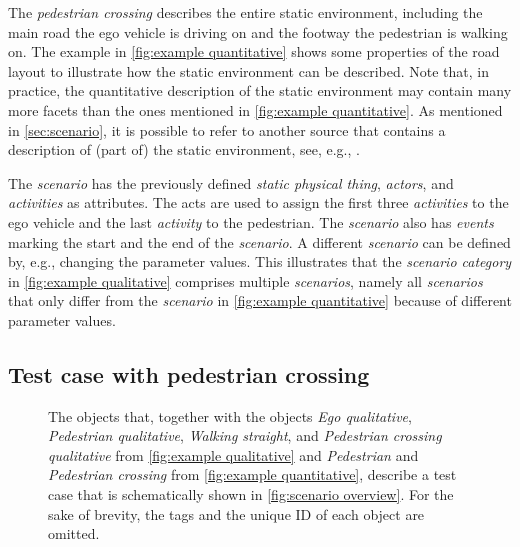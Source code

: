 The \textit{pedestrian crossing} describes \cstartd the entire static environment, including \cendd the main road the ego vehicle is driving on and the footway the pedestrian is walking on. The example in \cref{fig:example quantitative} shows some properties of the road layout to illustrate how the static environment can be described. Note that, in practice, the quantitative description of the static environment may contain many more facets than the ones mentioned in \cref{fig:example quantitative}. As mentioned in \cref{sec:scenario}, it is possible to refer to another source that contains a description of (part of) the static environment, see, e.g., \autocite{dupuis2010opendrive}. 

The \textit{scenario} has the previously defined \cstartc\textit{static physical thing}\cendc, \textit{actors}, and \textit{activities} as attributes. The acts are used to assign the first three \textit{activities} to the ego vehicle and the last \textit{activity} to the pedestrian. 
The \textit{scenario} also has \cstartb \textit{events} marking the start and the end of the \textit{scenario}\cendb.
A different \textit{scenario} can be defined by, e.g., changing the parameter values. This illustrates that the \textit{scenario category} in \cref{fig:example qualitative} comprises multiple \textit{scenarios}, namely all \textit{scenarios} that only differ from the \textit{scenario} in \cref{fig:example quantitative} because of different parameter values.



\subsection{Test case with pedestrian crossing}
\label{sec:example test case}


\begin{figure*}[t]
	\centering
	
	\caption{The objects that, together with the objects \emph{Ego qualitative}, \emph{Pedestrian qualitative}, \emph{Walking straight}, and \emph{Pedestrian crossing qualitative} from \cref{fig:example qualitative} and \emph{Pedestrian} and \emph{Pedestrian crossing} from \cref{fig:example quantitative}, describe a test case that is schematically shown in \cref{fig:scenario overview}. For the sake of brevity, the tags and the unique ID of each object are omitted.}
	\label{fig:example test case}
\end{figure*}


